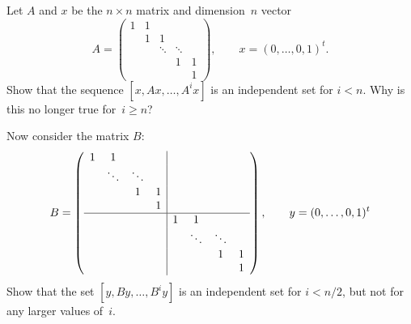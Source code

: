   Let $A$ and $x$ be the $n\times n$ matrix and dimension~$n$ vector
  \[
  A = \begin{pmatrix}
    1&1\\ &1&1\\ &&\ddots&\ddots\\ &&&1&1\\&&&&1
  \end{pmatrix},\qquad
  x =  (0,\ldots,0,1)^t.
  \]
  Show that the sequence $[x,Ax,\ldots,A^ix]$ is an independent set
  for $i<n$. Why is this no longer true for~$i\geq n$?

  Now consider the matrix $B$:
  \[ B=\left(
  \begin{array}{cccc|cccc}
    1&1&&\\ &\ddots&\ddots&\\ &&1&1\\ &&&1\\ \hline
    &&&&1&1\\ &&&&&\ddots&\ddots\\ &&&&&&1&1\\ &&&&&&&1
  \end{array}\right),\qquad
  y = (0,\ldots,0,1)^t
  \]
  Show that the set $[y,By,\ldots,B^iy]$ is an independent set for
  $i<n/2$, but not for any larger values of~$i$.
